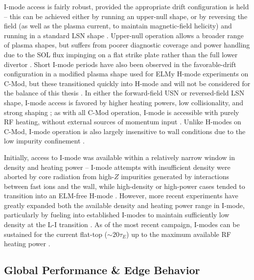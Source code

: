 I-mode access is fairly robust, provided the appropriate drift configuration is held -- this can be achieved either by running an upper-null shape, or by reversing the field (as well as the plasma current, to maintain magnetic-field helicity) and running in a standard LSN shape \cite{Hubbard2012}.  Upper-null operation allows a broader range of plasma shapes, but suffers from poorer diagnostic coverage and power handling due to the SOL flux impinging on a flat strike plate rather than the full lower divertor \cite{Hubbard2012,Dominguez2012}.  Short I-mode periods have also been observed in the favorable-drift configuration in a modified plasma shape used for ELMy H-mode experiments on C-Mod, but these transitioned quickly into H-mode and will not be considered for the balance of this thesis \cite{Dominguez2012,Hughes2013}.  In either the forward-field USN or reversed-field LSN shape, I-mode access is favored by higher heating powers, low 
collisionality, and strong shaping \cite{Whyte2010}; as with all C-Mod operation, I-mode is accessible with purely RF heating, without external sources of momentum input \cite{Hubbard2012b}.  Unlike H-modes on C-Mod, I-mode operation is also largely insensitive to wall conditions due to the low impurity confinement \cite{Hubbard2012}.

Initially, access to I-mode was available within a relatively narrow window in density and heating power -- I-mode attempts with insufficient density were aborted by core radiation from high-$Z$ impurities generated by interactions between fast ions and the wall, while high-density or high-power cases tended to transition into an ELM-free H-mode \cite{Whyte2010}.  However, more recent experiments have greatly expanded both the available density and heating power range in I-mode, particularly by fueling into established I-modes to maintain sufficiently low density at the L-I transition \cite{Hubbard2012b}.  As of the most recent campaign, I-modes can be sustained for the current flat-top ($\sim 20\tau_E$) up to the maximum available RF heating power \cite{Hubbard2012,Hubbard2012b}.

\subsection{Global Performance \& Edge Behavior}\label{subsec:hcr_imode_performance}

